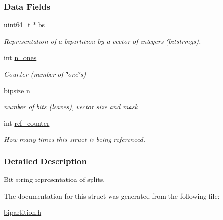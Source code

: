 \subsubsection*{Data Fields}
\begin{DoxyCompactItemize}
\item 
\mbox{\label{structbipartition__struct_a2cb01205ff03325f27f67237ec4945a2}} 
uint64\+\_\+t $\ast$ \hyperlink{structbipartition__struct_a2cb01205ff03325f27f67237ec4945a2}{bs}
\begin{DoxyCompactList}\small\item\em Representation of a bipartition by a vector of integers (bitstrings). \end{DoxyCompactList}\item 
\mbox{\label{structbipartition__struct_a9ab91a7d30c2e9b39f379886be39f949}} 
int \hyperlink{structbipartition__struct_a9ab91a7d30c2e9b39f379886be39f949}{n\+\_\+ones}
\begin{DoxyCompactList}\small\item\em Counter (number of \char`\"{}one\char`\"{}s) \end{DoxyCompactList}\item 
\mbox{\label{structbipartition__struct_a55bed1bfc645016d5f4e67fc3a5d1915}} 
\hyperlink{structbipsize__struct}{bipsize} \hyperlink{structbipartition__struct_a55bed1bfc645016d5f4e67fc3a5d1915}{n}
\begin{DoxyCompactList}\small\item\em number of bits (leaves), vector size and mask \end{DoxyCompactList}\item 
\mbox{\label{structbipartition__struct_aa6638f51d788a4b0475318be05a82a7b}} 
int \hyperlink{structbipartition__struct_aa6638f51d788a4b0475318be05a82a7b}{ref\+\_\+counter}
\begin{DoxyCompactList}\small\item\em How many times this struct is being referenced. \end{DoxyCompactList}\end{DoxyCompactItemize}


\subsubsection{Detailed Description}
Bit-\/string representation of splits. 

The documentation for this struct was generated from the following file\+:\begin{DoxyCompactItemize}
\item 
\hyperlink{bipartition_8h}{bipartition.\+h}\end{DoxyCompactItemize}
